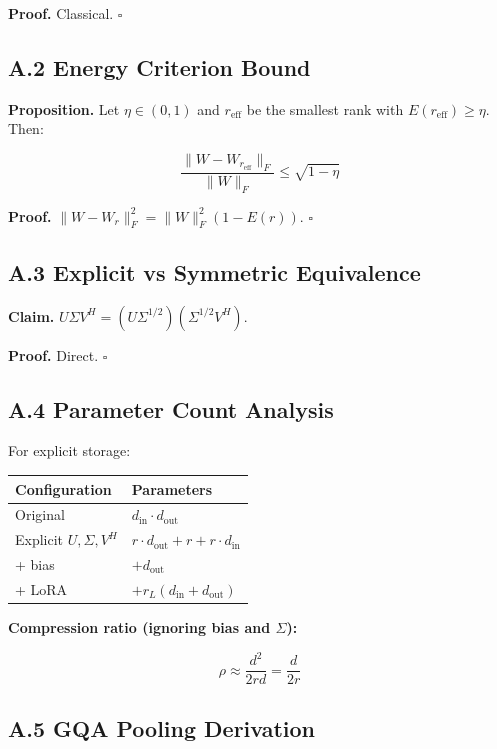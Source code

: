 \textbf{Proof.} Classical. $\square$

\subsection{A.2 Energy Criterion Bound}

\textbf{Proposition.} Let $\eta \in (0, 1)$ and $r_\text{eff}$ be the smallest 
rank with $E(r_\text{eff}) \geq \eta$. Then:

\[
\frac{\|W - W_{r_\text{eff}}\|_F}{\|W\|_F} \leq \sqrt{1 - \eta}
\tag{A.2}
\]

\textbf{Proof.} $\|W - W_r\|_F^2 = \|W\|_F^2 (1 - E(r))$. $\square$

\subsection{A.3 Explicit vs Symmetric Equivalence}

\textbf{Claim.} $U \Sigma V^H = (U \Sigma^{1/2}) (\Sigma^{1/2} V^H)$.

\textbf{Proof.} Direct. $\square$

\subsection{A.4 Parameter Count Analysis}

For explicit storage:

\begin{table}[H]
\centering
\small
\begin{tabular}{ll}
\toprule
\textbf{Configuration} & \textbf{Parameters} \\
\midrule
Original & $d_\text{in} \cdot d_\text{out}$ \\
Explicit $U, \Sigma, V^H$ & $r \cdot d_\text{out} + r + r \cdot d_\text{in}$ \\
+ bias & $+ d_\text{out}$ \\
+ LoRA & $+ r_L(d_\text{in} + d_\text{out})$ \\
\bottomrule
\end{tabular}
\end{table}

\textbf{Compression ratio (ignoring bias and $\Sigma$):}

\[
\rho \approx \frac{d^2}{2rd} = \frac{d}{2r}
\tag{A.3}
\]

\subsection{A.5 GQA Pooling Derivation}

